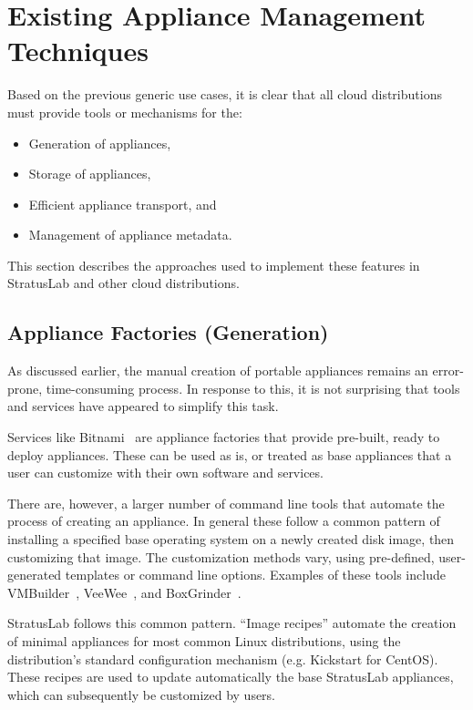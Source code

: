 \section{Existing Appliance Management Techniques}
\label{sec:other-approaches}

Based on the previous generic use cases, it is clear that all cloud
distributions must provide tools or mechanisms for the:
\begin{itemize}
\item Generation of appliances,
\item Storage of appliances,
\item Efficient appliance transport, and
\item Management of appliance metadata.
\end{itemize}
This section describes the approaches used to implement these features
in StratusLab and other cloud distributions.

\subsection{Appliance Factories (Generation)}

As discussed earlier, the manual creation of portable appliances
remains an error-prone, time-consuming process.  In response to this,
it is not surprising that tools and services have appeared to simplify
this task.

Services like Bitnami~\cite{bitnami} are appliance factories that
provide pre-built, ready to deploy appliances.  These can be used as
is, or treated as base appliances that a user can customize with their
own software and services.

There are, however, a larger number of command line tools that
automate the process of creating an appliance. In general these follow
a common pattern of installing a specified base operating system on a
newly created disk image, then customizing that image. The
customization methods vary, using pre-defined, user-generated
templates or command line options.  Examples of these tools include
VMBuilder~\cite{vmbuilder}, VeeWee~\cite{veewee}, and
BoxGrinder~\cite{boxgrinder}.

StratusLab follows this common pattern.  ``Image recipes'' automate
the creation of minimal appliances for most common Linux
distributions, using the distribution's standard configuration
mechanism (e.g. Kickstart for CentOS).  These recipes are used to
update automatically the base StratusLab appliances, which can
subsequently be customized by users.

